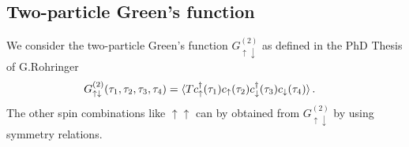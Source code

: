 \documentclass[12pt,a4paper]{scrartcl}
\numberwithin{equation}{section}
\begin{document}

\subsection{Two-particle Green's function}
We consider the two-particle Green's function $G^{(2)}_{\uparrow \downarrow}$ as defined in the PhD Thesis of G.Rohringer
\begin{align}
G^{(2)}_{\uparrow \downarrow}(\tau_1,\tau_2,\tau_3,\tau_4)
 &= \braket{T c^{\dagger}_{\uparrow}(\tau_1) c_{\uparrow}(\tau_2) c^{\dagger}_{\downarrow}(\tau_3) c_{\downarrow}(\tau_4)  }.
\end{align}
The other spin combinations like $\uparrow \uparrow $ can by obtained from $G^{(2)}_{\uparrow \downarrow}$ by using symmetry relations.
\end{document}
